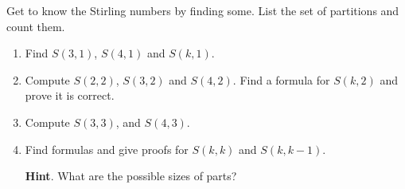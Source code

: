 \documentclass{book}
\begin{document}
\setcounter{cpjt}{198}
\addtocounter{cpjt}{-1}
\begin{activity}\label{act_stirlingcomputations}
\hypertarget{p-1077}{}%
Get to know the Stirling numbers by finding some.  List the set of partitions and count them.%
\begin{enumerate}[font=\bfseries,label=(\alph*),ref=\alph*]
\item\label{task-207} \hypertarget{p-1078}{}%
Find \(S(3,1)\), \(S(4,1)\) and \(S(k,1)\).%
\item\label{task-208} \hypertarget{p-1079}{}%
Compute \(S(2,2)\), \(S(3,2)\) and \(S(4,2)\).  Find a formula for \(S(k,2)\) and prove it is correct.%
\item\label{task-209} \hypertarget{p-1080}{}%
Compute \(S(3,3)\), and \(S(4,3)\).%
\item\label{task-210} \hypertarget{p-1081}{}%
Find formulas and give proofs for \(S(k,k)\) and \(S(k,k - 1)\).%
\par\smallskip%
\noindent\textbf{Hint}.\hypertarget{hint-125}{}\quad%
\hypertarget{p-1082}{}%
What are the possible sizes of parts?%
\par\smallskip%
\noindent\end{enumerate}
\end{activity}

\clearpage
\end{document}
